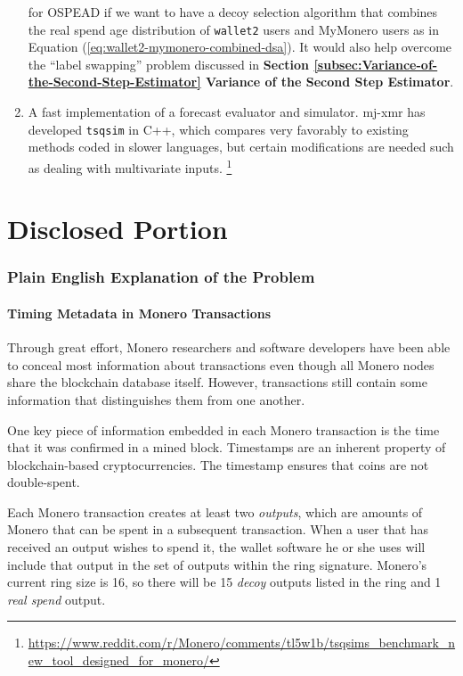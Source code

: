 \documentclass[english]{article}
\begin{document}
\begin{enumerate}
for OSPEAD if we want to have a decoy selection algorithm that combines
the real spend age distribution of \texttt{wallet2} users and MyMonero
users as in Equation (\ref{eq:wallet2-mymonero-combined-dsa}). It
would also help overcome the ``label swapping'' problem discussed
in \textbf{Section \ref{subsec:Variance-of-the-Second-Step-Estimator}
Variance of the Second Step Estimator}.
\item A fast implementation of a forecast evaluator and simulator. mj-xmr
has developed \texttt{tsqsim} in C++, which compares very favorably
to existing methods coded in slower languages, but certain modifications
are needed such as dealing with multivariate inputs. \footnote{\href{https://www.reddit.com/r/Monero/comments/tl5w1b/tsqsims_benchmark_new_tool_designed_for_monero/}{https://www.reddit.com/r/Monero/comments/tl5w1b/tsqsims\_benchmark\_new\_tool\_designed\_for\_monero/}}
\end{enumerate}
\newpage{}

\part{Disclosed Portion }

\section{Plain English Explanation of the Problem\label{sec:Plain-English-Explanation-of-the-Problem}}

\subsection{Timing Metadata in Monero Transactions}

Through great effort, Monero researchers and software developers have
been able to conceal most information about transactions even though
all Monero nodes share the blockchain database itself. However, transactions
still contain some information that distinguishes them from one another. 

One key piece of information embedded in each Monero transaction is
the time that it was confirmed in a mined block. Timestamps are an
inherent property of blockchain-based cryptocurrencies. The timestamp
ensures that coins are not double-spent. 

Each Monero transaction creates at least two \textit{outputs}, which
are amounts of Monero that can be spent in a subsequent transaction.
When a user that has received an output wishes to spend it, the wallet
software he or she uses will include that output in the set of outputs
within the ring signature. Monero's current ring size is 16, so there
will be 15 \textit{decoy} outputs listed in the ring and 1 \textit{real
spend} output.
\end{document}
